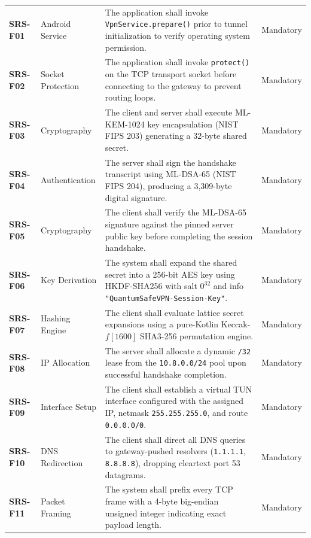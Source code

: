 \begin{longtable}{@{}P{1.8cm}P{3.4cm}P{6.4cm}P{2.4cm}@{}}
  \textbf{SRS-F01} & Android Service & The application shall invoke \texttt{VpnService.prepare()} prior to tunnel initialization to verify operating system permission. & Mandatory \\
  \addlinespace
  \textbf{SRS-F02} & Socket Protection & The application shall invoke \texttt{protect()} on the TCP transport socket before connecting to the gateway to prevent routing loops. & Mandatory \\
  \addlinespace
  \textbf{SRS-F03} & Cryptography & The client and server shall execute ML-KEM-1024 key encapsulation (NIST FIPS 203) generating a 32-byte shared secret. & Mandatory \\
  \addlinespace
  \textbf{SRS-F04} & Authentication & The server shall sign the handshake transcript using ML-DSA-65 (NIST FIPS 204), producing a 3,309-byte digital signature. & Mandatory \\
  \addlinespace
  \textbf{SRS-F05} & Cryptography & The client shall verify the ML-DSA-65 signature against the pinned server public key before completing the session handshake. & Mandatory \\
  \addlinespace
  \textbf{SRS-F06} & Key Derivation & The system shall expand the shared secret into a 256-bit AES key using HKDF-SHA256 with salt $0^{32}$ and info \texttt{"QuantumSafeVPN-Session-Key"}. & Mandatory \\
  \addlinespace
  \textbf{SRS-F07} & Hashing Engine & The client shall evaluate lattice secret expansions using a pure-Kotlin Keccak-$f[1600]$ SHA3-256 permutation engine. & Mandatory \\
  \addlinespace
  \textbf{SRS-F08} & IP Allocation & The server shall allocate a dynamic \texttt{/32} lease from the \texttt{10.8.0.0/24} pool upon successful handshake completion. & Mandatory \\
  \addlinespace
  \textbf{SRS-F09} & Interface Setup & The client shall establish a virtual TUN interface configured with the assigned IP, netmask \texttt{255.255.255.0}, and route \texttt{0.0.0.0/0}. & Mandatory \\
  \addlinespace
  \textbf{SRS-F10} & DNS Redirection & The client shall direct all DNS queries to gateway-pushed resolvers (\texttt{1.1.1.1}, \texttt{8.8.8.8}), dropping cleartext port 53 datagrams. & Mandatory \\
  \addlinespace
  \textbf{SRS-F11} & Packet Framing & The system shall prefix every TCP frame with a 4-byte big-endian unsigned integer indicating exact payload length. & Mandatory \\

\end{longtable}
